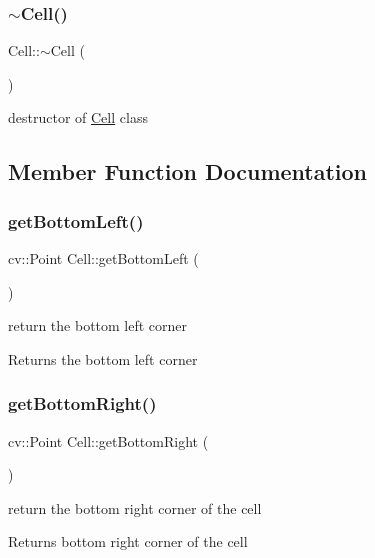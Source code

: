 \subsubsection{\texorpdfstring{$\sim$\+Cell()}{~Cell()}}
{\footnotesize\ttfamily Cell\+::$\sim$\+Cell (\begin{DoxyParamCaption}{ }\end{DoxyParamCaption})}

destructor of \mbox{\hyperlink{class_cell}{Cell}} class 

\subsection{Member Function Documentation}
\mbox{\label{class_cell_a1946142c5e112176e1cd20cc6d07f831}} 
\subsubsection{\texorpdfstring{get\+Bottom\+Left()}{getBottomLeft()}}
{\footnotesize\ttfamily cv\+::\+Point Cell\+::get\+Bottom\+Left (\begin{DoxyParamCaption}{ }\end{DoxyParamCaption})}

return the bottom left corner \begin{DoxyReturn}{Returns}
the bottom left corner 
\end{DoxyReturn}
\mbox{\label{class_cell_afa1704102095fd55ac036f7d290eed05}} 
\subsubsection{\texorpdfstring{get\+Bottom\+Right()}{getBottomRight()}}
{\footnotesize\ttfamily cv\+::\+Point Cell\+::get\+Bottom\+Right (\begin{DoxyParamCaption}{ }\end{DoxyParamCaption})}

return the bottom right corner of the cell \begin{DoxyReturn}{Returns}
bottom right corner of the cell 
\end{DoxyReturn}
\mbox{\label{class_cell_a03becce6b307d86848e9563eb08ac2b3}} 

